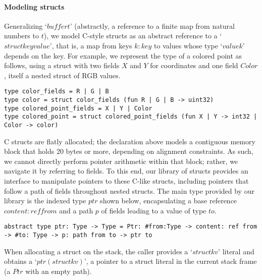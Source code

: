 \paragraph{Modeling structs}
\label{sec:structs}

Generalizing `\lst$buffer t$' (abstractly, a reference to a finite map
from natural numbers %
to \lst$t$), we model C-style structs as an
abstract reference to a `\lst$struct key value$', that is, a map from keys
\lst$k:key$ to values whose type `\lst$value k$' depends on the
key. 
%
For example, we represent the type of a colored point as follows,
using a struct with two fields \lst$X$ and \lst$Y$ for coordinates and one 
field \lst$Color$, itself a nested struct of RGB
values.

\begin{lstlisting}[numbers=none]
type color_fields = R | G | B
type color = struct color_fields (fun R | G | B -> uint32)
type colored_point_fields = X | Y | Color
type colored_point = struct colored_point_fields (fun X | Y -> int32 | Color -> color)
\end{lstlisting}


C structs are flatly allocated; the declaration above models a contiguous memory
block that holds 20 bytes or more, depending on alignment constraints. As such,
we cannot directly perform pointer arithmetic within that block; rather, we 
navigate it by referring to fields. 
%
To this end, our library of structs provides an interface to
manipulate pointers to these C-like structs, including pointers that
follow a path of fields throughout nested structs. The main type
provided by our library is the indexed type \lst$ptr$ shown below,
encapsulating a base reference \lst$content: ref from$ and a path
\lst$p$ of fields leading to a value of type \lst$to$.
%

\begin{lstlisting}[numbers=none]
abstract type ptr: Type -> Type = Ptr: #from:Type -> content: ref from -> #to: Type -> p: path from to -> ptr to
\end{lstlisting}

When allocating a struct on the stack, the caller provides a
`\lst$struct k v$' literal and obtains a
%
`\lst$ptr (struct k v)$', a pointer to a struct literal in the current
stack frame (a \lst$Ptr$ with an empty path).

